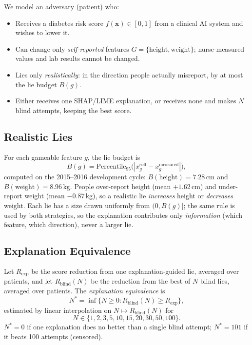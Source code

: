 \documentclass[sigconf,nonacm]{acmart}
\begin{document}
We model an adversary (patient) who:
\begin{itemize}
  \item Receives a diabetes risk score $f(\mathbf{x}) \in [0,1]$ from
        a clinical AI system and wishes to lower it.
  \item Can change only \emph{self-reported} features
        $G = \{\text{height}, \text{weight}\}$; nurse-measured values
        and lab results cannot be changed.
  \item Lies only \emph{realistically}: in the direction people
        actually misreport, by at most the lie budget $B(g)$.
  \item Either receives one SHAP/LIME explanation, or receives none
        and makes $N$ blind attempts, keeping the best score.
\end{itemize}

\subsection{Realistic Lies}

For each gameable feature $g$, the lie budget is
\[
  B(g) = \text{Percentile}_{95}\bigl(|x_g^{\text{self}} - x_g^{\text{measured}}|\bigr),
\]
computed on the 2015--2016 development cycle:
$B(\text{height}) = 7.28\,\text{cm}$ and
$B(\text{weight}) = 8.96\,\text{kg}$.  People over-report height
(mean $+1.62$\,cm) and under-report weight (mean $-0.87$\,kg), so a
realistic lie \emph{increases} height or \emph{decreases} weight.
Each lie has a size drawn uniformly from $(0, B(g)]$; the same rule is
used by both strategies, so the explanation contributes only
\emph{information} (which feature, which direction), never a larger lie.

\subsection{Explanation Equivalence}

\begin{definition}
Let $R_{\text{exp}}$ be the score reduction from one
explanation-guided lie, averaged over patients, and let
$R_{\text{blind}}(N)$ be the reduction from the best of $N$ blind
lies, averaged over patients.  The \emph{explanation equivalence} is
\[
  N^* = \inf \{ N \geq 0 : R_{\text{blind}}(N) \geq R_{\text{exp}} \},
\]
estimated by linear interpolation on $N \mapsto R_{\text{blind}}(N)$ for
\[
  N \in \{1,2,3,5,10,15,20,30,50,100\}.
\]
$N^*=0$ if one explanation does no better than a single blind
attempt; $N^*=101$ if it beats 100 attempts (censored).
\end{definition}
\end{document}
